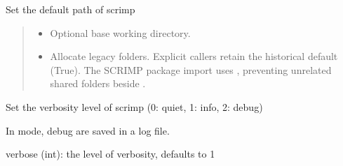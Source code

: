 \documentclass[letterpaper,10pt,english]{sphinxmanual}
\begin{document}
\begin{fulllineitems}
\label{\detokenize{scrimp.utils:scrimp.utils.config.set_paths}}
\pysigstartsignatures
\pysiglinewithargsret
{}
{\sphinxparamcomma {}\sphinxparamcomma {}}
{}
\pysigstopsignatures
\sphinxAtStartPar
Set the default path of scrimp
\begin{quote}\begin{description}
\begin{itemize}
\item {} 
\sphinxAtStartPar
{} \textendash{} Optional base working directory.

\item {} 
\sphinxAtStartPar
{} \textendash{} Allocate legacy  folders.
Explicit callers retain the historical default (True).
The SCRIMP package import uses , preventing
unrelated shared folders beside .

\end{itemize}

\end{description}\end{quote}

\end{fulllineitems}


\begin{fulllineitems}
\label{\detokenize{scrimp.utils:scrimp.utils.config.set_verbose}}
\pysigstartsignatures
\pysiglinewithargsret
{}
{}
{}
\pysigstopsignatures
\sphinxAtStartPar
Set the verbosity level of scrimp (0: quiet, 1: info, 2: debug)

\sphinxAtStartPar
In  mode, debug are saved in a log file.
\begin{description}
\sphinxAtStartPar
verbose (int): the level of verbosity, defaults to 1

\end{description}

\end{fulllineitems}
\end{document}
